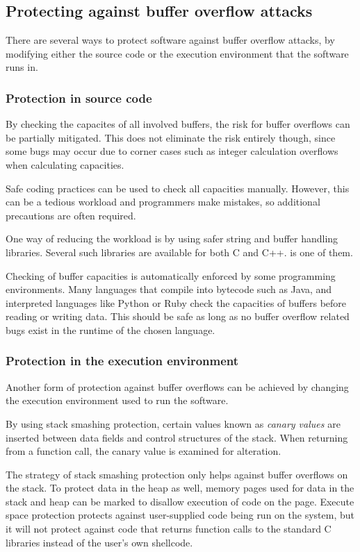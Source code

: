 \subsection{Protecting against buffer overflow attacks}
There are several ways to protect software against buffer overflow attacks,
by modifying either the source code or
the execution environment that the software runs in.

\subsubsection{Protection in source code}
By checking the capacites of all involved buffers,
the risk for buffer overflows can be partially mitigated.
This does not eliminate the risk entirely though,
since some bugs may occur due to corner cases
such as integer calculation overflows when calculating capacities.

Safe coding practices can be used to check all capacities manually.
However, this can be a tedious workload and
programmers make mistakes,
so additional precautions are often required.

One way of reducing the workload is by using
safer string and buffer handling libraries.
Several such libraries are available for both C and C++. 
\strsafe{} is one of them.

Checking of buffer capacities is automatically enforced
by some programming environments.
Many languages that compile into bytecode such as Java,
and interpreted languages like Python or Ruby
check the capacities of buffers before reading or writing data.
This should be safe as long as no buffer overflow related bugs exist
in the runtime of the chosen language.

\subsubsection{Protection in the execution environment}
Another form of protection against buffer overflows can be achieved
by changing the execution environment used to run the software.

By using stack smashing protection, certain values known as
\emph{canary values} are inserted between data fields and
control structures of the stack.
When returning from a function call,
the canary value is examined for alteration.

The strategy of stack smashing protection only helps against
buffer overflows on the stack.
To protect data in the heap as well,
memory pages used for data in the stack and heap can be marked to
disallow execution of code on the page.
Execute space protection protects against user-supplied code
being run on the system,
but it will not protect against code that returns function calls to
the standard C libraries instead of the user's own shellcode.

